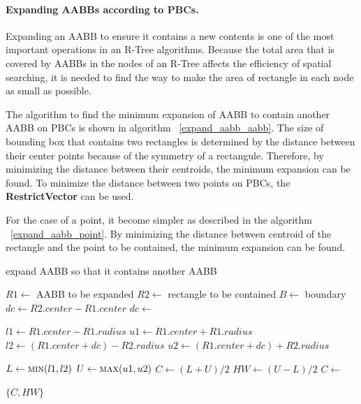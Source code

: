 \documentclass[10pt,letterpaper,twocolumn]{article}
\begin{document}
\paragraph{Expanding AABBs according to PBCs.}
Expanding an AABB to ensure it contains a new contents is one of the most
important operations in an R-Tree algorithms.
Because the total area that is covered by AABBs in the nodes of an R-Tree
affects the efficiency of spatial searching, it is needed to find the way to
make the area of rectangle in each node as small as possible.

The algorithm to find the minimum expansion of AABB to contain another AABB on
PBCs is shown in algorithm ~\ref{expand_aabb_aabb}.
The size of bounding box that contains two rectangles is determined by the
distance between their center points because of the symmetry of a rectangule.
Therefore, by minimizing the distance between their centroids, the minimum
expansion can be found. To minimize the distance between two points on PBCs,
the \textbf{RestrictVector} can be used.

For the case of a point, it become simpler as described in the algorithm
~\ref{expand_aabb_point}. By minimizing the distance between centroid of the
rectangle and the point to be contained, the minimum expansion can be found.

\begin{algorithm}[htb]
    \caption{expand AABB so that it contains another AABB}
    \label{expand_aabb_aabb}
    \begin{algorithmic}
        \State $R1 \gets$ AABB to be expanded
        \State $R2 \gets$ rectangle to be contained
        \State $B  \gets$ boundary
            \State $dc \gets R2.center - R1.center$
            \State $dc \gets$ 

            \State $l1 \gets R1.center - R1.radius$
            \State $u1 \gets R1.center + R1.radius$
            \State $l2 \gets (R1.center + dc) - R2.radius$
            \State $u2 \gets (R1.center + dc) + R2.radius$

            \State $L  \gets \Call{min}{l1, l2}$
            \State $U  \gets \Call{max}{u1, u2}$
            \State $C  \gets (L + U) / 2$
            \State $HW \gets (U - L) / 2$
            \State $C  \gets$ 

            \State \Return $\{C, HW\}$
        \EndFunction
     \end{algorithmic}
\end{algorithm}
\end{document}
